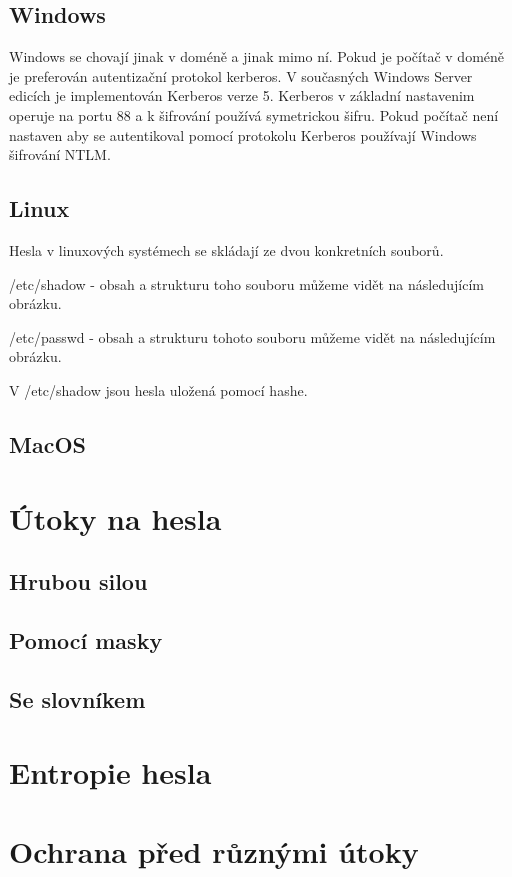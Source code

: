 \subsection{Windows}

Windows se chovají jinak v doméně a jinak mimo ní. Pokud je počítač v doméně je preferován autentizační protokol kerberos. V současných Windows Server edicích je implementován Kerberos verze 5. Kerberos v základní nastavenim operuje na portu 88 a k šifrování používá symetrickou šifru. 
Pokud počítač není nastaven aby se autentikoval pomocí protokolu Kerberos používají Windows šifrování NTLM.

\subsection{Linux}

Hesla v linuxových systémech se skládají ze dvou konkretních souborů. 

/etc/shadow - obsah a strukturu toho souboru můžeme vidět na následujícím obrázku. 


/etc/passwd - obsah a strukturu tohoto souboru můžeme vidět na následujícím obrázku.


V /etc/shadow jsou hesla uložená pomocí hashe. 

\subsection{MacOS}


\section{Útoky na hesla}

\subsection{Hrubou silou}

\subsection{Pomocí masky}

\subsection{Se slovníkem}

\section{Entropie hesla}

\section{Ochrana před různými útoky}

